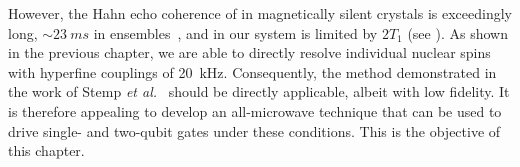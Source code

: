 However, the Hahn echo coherence of \Er in magnetically silent crystals is exceedingly long, $\sim23~ms$ in ensembles~, and in our system is limited by $2T_1$ (see ). As shown in the previous chapter, we are able to directly resolve individual nuclear spins with hyperfine couplings of 20~kHz. Consequently, the method demonstrated in the work of Stemp \textit{et al.}~ should be directly applicable, albeit with low fidelity. It is therefore appealing to develop an all-microwave technique that can be used to drive single- and two-qubit gates under these conditions. This is the objective of this chapter.






